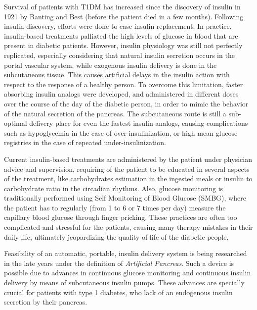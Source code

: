 Survival of patients with T1DM has increased since the discovery of insulin in 1921 by Banting and Best \cite{banting1922internal} (before the patient died in a few months). Following insulin discovery, efforts were done to ease insulin replacement. In practice, insulin-based treatments palliated the high levels of glucose in blood that are present in diabetic patients. However, insulin physiology was still not perfectly replicated, especially considering that natural insulin secretion occurs in the portal vascular system, while exogenous insulin delivery is done in the subcutaneous tissue. This causes artificial delays in the insulin action with respect to the response of a healthy person. To overcome this limitation, faster absorbing insulin analogs were developed, and administered in different doses over the course of the day of the diabetic person, in order to mimic the behavior of the natural secretion of the pancreas. The subcutaneous route is still a sub-optimal delivery place for even the fastest insulin analogs, causing complications such as hypoglycemia in the case of over-insulinization, or high mean glucose registries in the case of repeated under-insulinization. 

Current insulin-based treatments are administered by the patient under physician advice and supervision, requiring of the patient to be educated in several aspects of the treatment, like carbohydrates estimation in the ingested meals or insulin to carbohydrate ratio in the circadian rhythms. Also, glucose monitoring is traditionally performed using Self Monitoring of Blood Glucose (SMBG), where the patient has to regularly (from 1 to 6 or 7 times per day) measure the capillary blood glucose through finger pricking. These practices are often too complicated and stressful for the patients, causing many therapy mistakes in their daily life, ultimately jeopardizing the quality of life of the diabetic people.

Feasibility of an automatic, portable, insulin delivery system is being researched in the late years under the definition of \emph{Artificial Pancreas}. Such a device is possible due to advances in continuous glucose monitoring and continuous insulin delivery by means of subcutaneous insulin pumps. These advances are specially crucial for patients with type 1 diabetes, who lack of an endogenous insulin secretion by their pancreas. 

